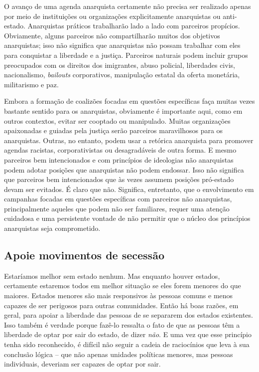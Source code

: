 O avanço de uma agenda anarquista certamente não precisa ser realizado apenas por meio de instituições ou organizações explicitamente anarquistas ou anti-estado. Anarquistas práticos trabalharão lado a lado com parceiros propícios. Obviamente, alguns parceiros não compartilharão muitos dos objetivos anarquistas; isso não significa que anarquistas não possam trabalhar com eles para conquistar a liberdade e a justiça. Parceiros naturais podem incluir grupos preocupados com os direitos dos imigrantes, abuso policial, liberdades civis, nacionalismo, \emph{bailouts} corporativos, manipulação estatal da oferta monetária, militarismo e paz.

Embora a formação de coalizões focadas em questões específicas faça muitas vezes bastante sentido para os anarquistas, obviamente é importante aqui, como em outros contextos, evitar ser cooptado ou manipulado. Muitas organizações apaixonadas e guiadas pela justiça serão parceiros maravilhosos para os anarquistas. Outras, no entanto, podem usar a retórica anarquista para promover agendas racistas, corporativistas ou desagradáveis de outra forma. E mesmo parceiros bem intencionados e com princípios de ideologias não anarquistas podem adotar posições que anarquistas não podem endossar. Isso não significa que parceiros bem intencionados que às vezes assumem posições pró-estado devam ser evitados. É claro que não. Significa, entretanto, que o envolvimento em campanhas focadas em questões específicas com parceiros não anarquistas, principalmente aqueles que podem não ser familiares, requer uma atenção cuidadosa e uma persistente vontade de não permitir que o núcleo dos princípios anarquistas seja comprometido.

\subsection*{Apoie movimentos de secessão}

Estaríamos melhor sem estado nenhum. Mas enquanto houver estados, certamente estaremos todos em melhor situação se eles forem menores do que maiores. Estados menores são mais responsivos às pessoas comuns e menos capazes de ser perigosos para outras comunidades. Então há boas razões, em geral, para apoiar a liberdade das pessoas de se separarem dos estados existentes. Isso também é verdade porque fazê-lo ressalta o fato de que as pessoas têm a liberdade de optar por sair do estado, de dizer \emph{não}. E uma vez que esse princípio tenha sido reconhecido, é difícil não seguir a cadeia de raciocínios que leva à sua conclusão lógica -- que não apenas unidades políticas menores, mas pessoas individuais, deveriam ser capazes de optar por sair.

